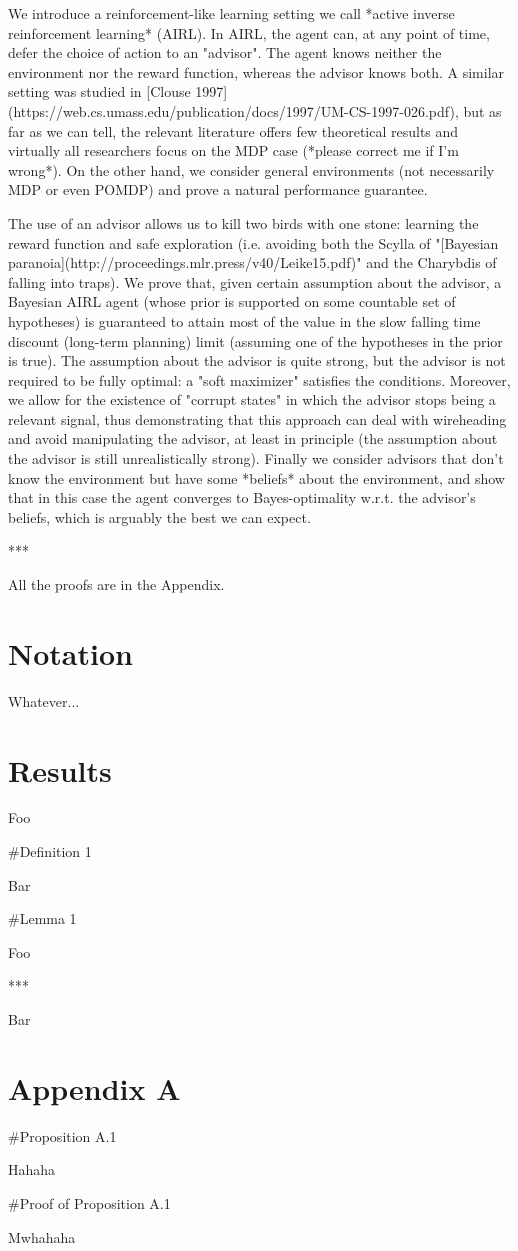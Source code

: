 \documentclass[a4paper]{article}
\begin{document}
We introduce a reinforcement-like learning setting we call *active inverse reinforcement learning* (AIRL). In AIRL, the agent can, at any point of time, defer the choice of action to an "advisor". The agent knows neither the environment nor the reward function, whereas the advisor knows both. A similar setting was studied in [Clouse 1997](https://web.cs.umass.edu/publication/docs/1997/UM-CS-1997-026.pdf), but as far as we can tell, the relevant literature offers few theoretical results and virtually all researchers focus on the MDP case (*please correct me if I'm wrong*). On the other hand, we consider general environments (not necessarily MDP or even POMDP) and prove a natural performance guarantee.

The use of an advisor allows us to kill two birds with one stone: learning the reward function and safe exploration (i.e. avoiding both the Scylla of "[Bayesian paranoia](http://proceedings.mlr.press/v40/Leike15.pdf)" and the Charybdis of falling into traps). We prove that, given certain assumption about the advisor, a Bayesian AIRL agent (whose prior is supported on some countable set of hypotheses) is guaranteed to attain most of the value in the slow falling time discount (long-term planning) limit (assuming one of the hypotheses in the prior is true). The assumption about the advisor is quite strong, but the advisor is not required to be fully optimal: a "soft maximizer" satisfies the conditions. Moreover, we allow for the existence of "corrupt states" in which the advisor stops being a relevant signal, thus demonstrating that this approach can deal with wireheading and avoid manipulating the advisor, at least in principle (the assumption about the advisor is still unrealistically strong). Finally we consider advisors that don't know the environment but have some *beliefs* about the environment, and show that in this case the agent converges to Bayes-optimality w.r.t. the advisor's beliefs, which is arguably the best we can expect.

***

All the proofs are in the Appendix.

\section{Notation}

Whatever...

\section{Results}

Foo

\#Definition 1

Bar

\#Lemma 1

Foo

***

Bar

\section{Appendix A}

\#Proposition A.1

Hahaha

\#Proof of Proposition A.1

Mwhahaha
\end{document}
